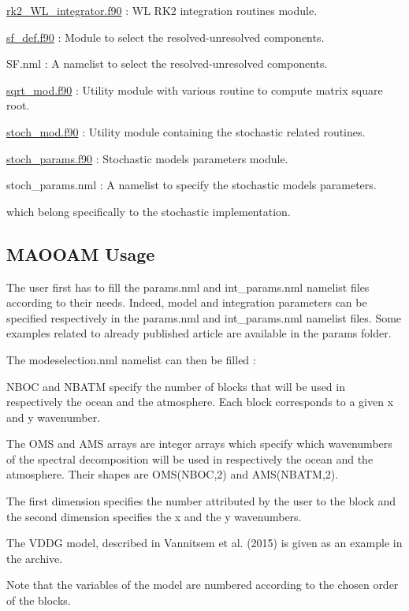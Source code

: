 \begin{DoxyItemize}
\item \hyperlink{rk2__WL__integrator_8f90}{rk2\+\_\+\+W\+L\+\_\+integrator.\+f90} \+: WL R\+K2 integration routines module.
\item \hyperlink{sf__def_8f90}{sf\+\_\+def.\+f90} \+: Module to select the resolved-\/unresolved components.
\item S\+F.\+nml \+: A namelist to select the resolved-\/unresolved components.
\item \hyperlink{sqrt__mod_8f90}{sqrt\+\_\+mod.\+f90} \+: Utility module with various routine to compute matrix square root.
\item \hyperlink{stoch__mod_8f90}{stoch\+\_\+mod.\+f90} \+: Utility module containing the stochastic related routines.
\item \hyperlink{stoch__params_8f90}{stoch\+\_\+params.\+f90} \+: Stochastic models parameters module.
\item stoch\+\_\+params.\+nml \+: A namelist to specify the stochastic models parameters.
\end{DoxyItemize}

which belong specifically to the stochastic implementation.





\subsection*{M\+A\+O\+O\+AM Usage}

The user first has to fill the params.\+nml and int\+\_\+params.\+nml namelist files according to their needs. Indeed, model and integration parameters can be specified respectively in the params.\+nml and int\+\_\+params.\+nml namelist files. Some examples related to already published article are available in the params folder.

The modeselection.\+nml namelist can then be filled \+:
\begin{DoxyItemize}
\item N\+B\+OC and N\+B\+A\+TM specify the number of blocks that will be used in respectively the ocean and the atmosphere. Each block corresponds to a given x and y wavenumber.
\item The O\+MS and A\+MS arrays are integer arrays which specify which wavenumbers of the spectral decomposition will be used in respectively the ocean and the atmosphere. Their shapes are O\+M\+S(\+N\+B\+O\+C,2) and A\+M\+S(\+N\+B\+A\+T\+M,2).
\item The first dimension specifies the number attributed by the user to the block and the second dimension specifies the x and the y wavenumbers.
\item The V\+D\+DG model, described in Vannitsem et al. (2015) is given as an example in the archive.
\item Note that the variables of the model are numbered according to the chosen order of the blocks.
\end{DoxyItemize}


